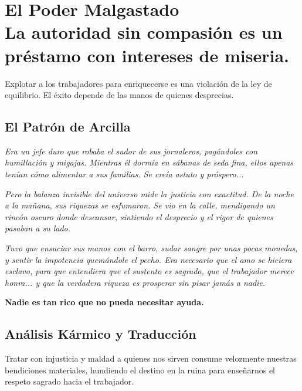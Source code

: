 \chapter[El Poder Malgastado]{El Poder Malgastado\\ \large La autoridad sin compasión es un préstamo con intereses de miseria.}


\lettrine[lines=3, nindent=0.5em, findent=0.2em]{E}{}xplotar a los trabajadores para enriquecerse es una violación de la ley de equilibrio. El éxito depende de las manos de quienes desprecias.

\section{El Patrón de Arcilla}
\begin{elegantquote}
\textit{Era un jefe duro que robaba el sudor de sus jornaleros, pagándoles con humillación y migajas. Mientras él dormía en sábanas de seda fina, ellos apenas tenían cómo alimentar a sus familias. Se creía astuto y próspero...}

\textit{Pero la balanza invisible del universo mide la justicia con exactitud. De la noche a la mañana, sus riquezas se esfumaron. Se vio en la calle, mendigando un rincón oscuro donde descansar, sintiendo el desprecio y el rigor de quienes pasaban a su lado.}

\textit{Tuvo que ensuciar sus manos con el barro, sudar sangre por unas pocas monedas, y sentir la impotencia quemándole el pecho. Era necesario que el amo se hiciera esclavo, para que entendiera que el sustento es sagrado, que el trabajador merece honra... y que la verdadera riqueza es prosperar sin pisar jamás a nadie.}

\end{elegantquote}

\vspace{1em}
\begin{center}
    \textbf{\Large Nadie es tan rico que no pueda necesitar ayuda.}
\end{center}
\vspace{1em}

\section{Análisis Kármico y Traducción}
\begin{figure}
  \vspace{-1.5em}
  \begin{center}
  \end{center}
  \vspace{-1.5em}
\end{figure}
Tratar con injusticia y maldad a quienes nos sirven consume velozmente nuestras bendiciones materiales, hundiendo el destino en la ruina para enseñarnos el respeto sagrado hacia el trabajador.


